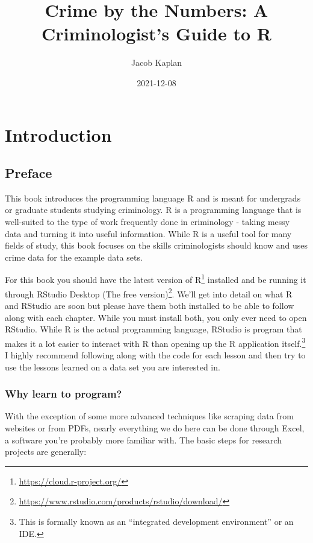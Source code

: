 \documentclass[
]{krantz}
\title{Crime by the Numbers: A Criminologist's Guide to R}
\author{Jacob Kaplan}
\date{2021-12-08}
\renewcommand{\href}[2]{#2\footnote{\url{#1}}}
\begin{document}
\maketitle

{
\hypersetup{linkcolor=}
\setcounter{tocdepth}{2}
\tableofcontents
}
\mainmatter

\hypertarget{part-introduction}{%
\part{Introduction}\label{part-introduction}}

\hypertarget{preface}{%
\chapter{Preface}\label{preface}}

This book introduces the programming language R and is meant for undergrads or graduate students studying criminology. R is a programming language that is well-suited to the type of work frequently done in criminology - taking messy data and turning it into useful information. While R is a useful tool for many fields of study, this book focuses on the skills criminologists should know and uses crime data for the example data sets.

For this book you should have the latest version of \href{https://cloud.r-project.org/}{R} installed and be running it through \href{https://www.rstudio.com/products/rstudio/download/}{RStudio Desktop (The free version)}. We'll get into detail on what R and RStudio are soon but please have them both installed to be able to follow along with each chapter. While you must install both, you only ever need to open RStudio. While R is the actual programming language, RStudio is program that makes it a lot easier to interact with R than opening up the R application itself.\footnote{This is formally known as an ``integrated development environment'' or an IDE.} I highly recommend following along with the code for each lesson and then try to use the lessons learned on a data set you are interested in.

\hypertarget{why-learn-to-program}{%
\section{Why learn to program?}\label{why-learn-to-program}}

With the exception of some more advanced techniques like scraping data from websites or from PDFs, nearly everything we do here can be done through Excel, a software you're probably more familiar with. The basic steps for research projects are generally:
\end{document}
